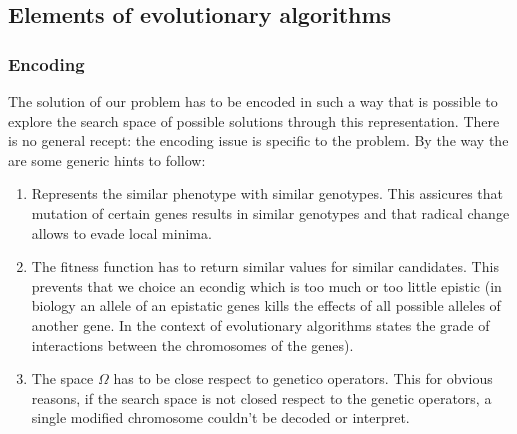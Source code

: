 \documentclass{article}
\begin{document}
\subsection{Elements of evolutionary algorithms}
\subsubsection{Encoding}
The solution of our problem has to be encoded in such a way that is possible to explore
the search space of possible solutions through this representation. There is no general recept:
the encoding issue is specific to the problem. By the way the are some generic hints to follow:
\begin{enumerate}
    \item Represents the similar phenotype with similar genotypes. This assicures that
          mutation of certain genes results in similar genotypes and that radical change allows to
          evade local minima.
    \item The fitness function has to return similar values for similar candidates. This prevents
          that we choice an econdig which is too much or too little epistic (in biology an allele of
          an epistatic genes kills the effects of all possible alleles of another gene. In the context
          of evolutionary algorithms states the grade of interactions between the chromosomes of the genes).
    \item The space $\Omega$ has to be close respect to genetico operators. This for obvious
          reasons, if the search space is not closed respect to the genetic operators, a single modified
          chromosome couldn't be decoded or interpret.
\end{enumerate}
\end{document}
